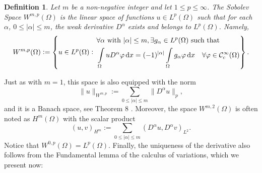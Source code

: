 \documentclass[a4paper,doc,11pt]{article}
\newtheorem{definition}[theorem]{Definition}
\newcommand{\CC}{\mathcal{C}}
\begin{document}
\begin{definition}
Let \(m\) be a non-negative integer and let \( 1\leq p \leq \infty\). The Sobolev Space \(W^{m,p} (\Omega)\) is the linear space of functions \( u \in L^p (\Omega)\) such that for each \(\alpha\), \(0 \leq |\alpha| \leq m\), the weak derivative \(D^\alpha\) exists and belongs to \(L^p (\Omega)\). Namely,
\[
    W^{m,p} (\Omega) :=
    \left\{
        u \in L^p (\Omega): \,
        \begin{aligned}
        &\forall \alpha \text{ with } |\alpha| \leq m, \exists g_{\alpha} \in L^p (\Omega) \text{ such that } 
        \\
        &\int\limits_\Omega u D^\alpha \varphi \dif x = (-1)^{|\alpha|}\int\limits_\Omega g_\alpha \varphi \dif x \quad \forall \varphi \in \CC_c^\infty (\Omega)
        \end{aligned}
    \right\}.
\]
\end{definition}

Just as with \(m = 1\), this space is also equipped with the norm
\[
    \|u\|_{W^{m,p}} :=  \sum_{0\leq |\alpha| \leq m} \| D^\alpha u \|_p,
\]
and it is a Banach space, see Theorem 8 \citep{Ball2019}. Moreover, the space \(W^{m,2}(\Omega)\) is often noted as \(H^m (\Omega)\) with the scalar product
\[
    (u,v)_{H^m} := \sum_{0\leq |\alpha| \leq m}  (D^\alpha u, D^\alpha v)_{L^2}.
\]
Notice that \(W^{0,p} (\Omega) = L^p (\Omega)\). Finally, the uniqueness of the derivative also follows from the Fundamental lemma of the calculus of variations, which we present now:
\end{document}
